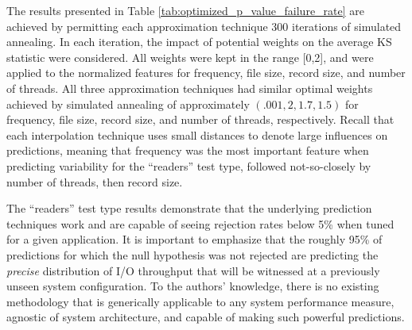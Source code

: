 The results presented in Table \ref{tab:optimized_p_value_failure_rate} are achieved by permitting each approximation technique 300 iterations of simulated annealing. In each iteration, the impact of potential weights on the average KS statistic were considered. All weights were kept in the range [0,2], and were applied to the normalized features for frequency, file size, record size, and number of threads. All three approximation techniques had similar optimal weights achieved by simulated annealing of approximately $(.001, 2, 1.7, 1.5)$ for frequency, file size, record size, and number of threads, respectively. Recall that each interpolation technique uses small distances to denote large influences on predictions, meaning that frequency was the most important feature when predicting variability for the ``readers'' test type, followed not-so-closely by number of threads, then record size.

The ``readers'' test type results demonstrate that the underlying prediction techniques work and are capable of seeing rejection rates below 5\% when tuned for a given application. It is important to emphasize that the roughly 95\% of predictions for which the null hypothesis was not rejected are predicting the \textit{precise} distribution of I/O throughput that will be witnessed at a previously unseen system configuration. To the authors' knowledge, there is no existing methodology that is generically applicable to any system performance measure, agnostic of system architecture, and capable of making such powerful predictions.


